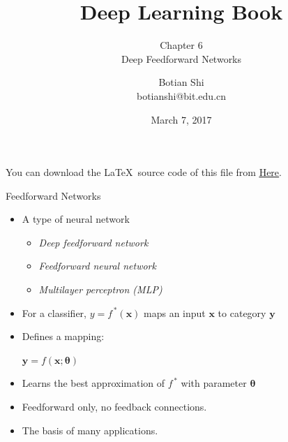 \documentclass[10pt]{beamer}
\begin{document}
	\title{Deep Learning Book}
	\subtitle{Chapter 6 \\ Deep Feedforward Networks}
	\author{Botian Shi \\ botianshi@bit.edu.cn}
	\date{March 7, 2017}
	
	
	\begin{frame}[plain]
		\titlepage
	\end{frame}

	\begin{frame}
		You can download the \LaTeX\, source code of this file from \href{https://github.com/friskit-china/DLBookSlides}{\underline{Here}}.
	\end{frame}
	
	\begin{frame}{Feedforward Networks}
		\pause
		\begin{itemize}
			\item A type of neural network
				\begin{itemize}
					\item \emph{Deep feedforward network}
					\item \emph{Feedforward neural network}
					\item \emph{Multilayer perceptron (MLP)}
				\end{itemize}
			\pause
			\item For a classifier, $y = f^{\,*}(\bm{x})$ maps an input $\bm{x}$ to category $\bm{y}$
			\item Defines a mapping:
					\begin{center}
						$\bm{y}=f(\bm{x};\bm{\theta})$
					\end{center}
			\item Learns the best approximation of $f^{\,*}$ with parameter $\bm{\theta}$
			\pause
			\item Feedforward only, no feedback connections.
			\pause
			\item The basis of many applications.
		\end{itemize}
	\end{frame}
\end{document}
